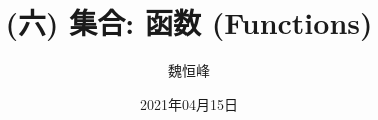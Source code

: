 \documentclass[]{beamer}
\title[(六) 函数 (Functions)]{(六) 集合: 函数 (Functions)}
\author[魏恒峰]{\large 魏恒峰}
\institute{hfwei@nju.edu.cn}
\date{2021年04月15日}
\begin{document}
\maketitle







\thankyou{}

\end{document}
